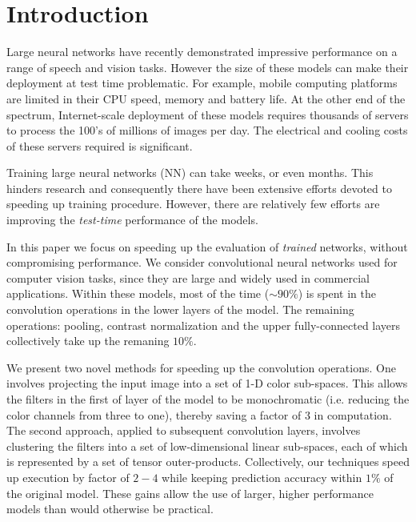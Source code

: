 \documentclass{article}
\begin{document}
 




\begin{abstract}

\end{abstract}

\section{Introduction}

Large neural networks have recently demonstrated impressive
performance on a range of speech and vision tasks. However the size of
these models can make their deployment at test time problematic. For
example, mobile computing platforms are limited in their CPU speed,
memory and battery life. At the other end of the spectrum,
Internet-scale deployment of these models requires thousands of
servers to process the 100's of millions of images per day. The
electrical and cooling costs of these servers required is significant.

Training large neural networks (NN) can take weeks, or even
months. This hinders research and consequently there have been
extensive efforts devoted to speeding up training procedure.  However,
there are relatively few efforts are improving the {\em test-time}
performance of the models. 

In this paper we focus on speeding up the
evaluation of {\em trained} networks, without compromising
performance. We consider convolutional neural networks used for
computer vision tasks, since they are large and widely used in
commercial applications. Within these models, most of the time ($\sim90\%$) is spent in the
convolution operations in the lower layers of the model. The remaining
operations: pooling, contrast normalization and the upper
fully-connected layers collectively take up the remaning $10\%$.

We present two novel methods for speeding up the convolution
operations. One involves projecting the input image into a set of 1-D
color sub-spaces. This allows the filters in the first of layer of the
model to be monochromatic (i.e. reducing the color channels from three
to one), thereby saving a factor of 3 in computation. The second
approach, applied to subsequent convolution layers, involves
clustering the filters into a set of low-dimensional linear
sub-spaces, each of which is represented by a set of tensor
outer-products. Collectively, our techniques speed up execution by
factor of $2-4$ while keeping prediction accuracy within $1\%$ of the
original model. These gains allow the use of larger, higher
performance models than would otherwise be practical.
\end{document}
